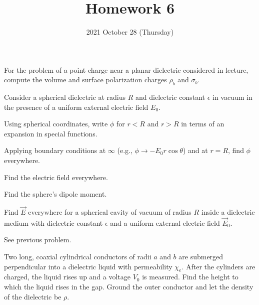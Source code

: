 \documentclass{phys151}
\title{Homework 6}
\date{2021 October 28 (Thursday)}
\author{}
\begin{document}
\begin{problem}
  For the problem of a point charge near a planar dielectric considered in
  lecture, compute the volume and surface polarization charges \(\rho_b\) and
  \(\sigma_b\).
\end{problem}

\begin{solution}

\end{solution}

\begin{problem}
  Consider a spherical dielectric at radius \(R\) and dielectric constant
  \(\epsilon\) in vacuum in the presence of a uniform external electric field
  \(E_0\).
  \begin{subproblems}
  \item Using spherical coordinates, write \(\phi\) for \(r<R\) and \(r>R\)
    in terms of an expansion in special functions.
  \item Applying boundary conditions at \(\infty\) (e.g., \(\phi \to -E_0 r
    \cos \theta\)) and at \(r=R\), find \(\phi\) everywhere.
  \item Find the electric field everywhere.
  \item Find the sphere's dipole moment.
  \end{subproblems}
\end{problem}

\begin{solution}

\end{solution}

\begin{problem}
  Find \(\vec E\) everywhere for a spherical cavity of vacuum of radius \(R\)
  inside a dielectric medium with dielectric constant \(\epsilon\) and a
  uniform external electric field \(\vec E_0\).
  \begin{hint}
    See previous problem.
  \end{hint}
\end{problem}

\begin{solution}

\end{solution}

\begin{problem}
  Two long, coaxial cylindrical conductors of radii \(a\) and \(b\) are
  submerged perpendicular into a dielectric liquid with permeability
  \(\chi_e\).  After the cylinders are charged, the liquid rises up and a
  voltage \(V_0\) is measured.  Find the height to which the liquid rises in
  the gap.  Ground the outer conductor and let the density of the dielectric be
  \(\rho\).
\end{problem}

\begin{solution}

\end{solution}
\end{document}
